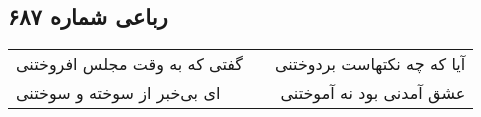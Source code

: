 \begin{center}
\section*{رباعی شماره ۶۸۷}
\label{sec:sh687}
\begin{longtable}{l p{0.5cm} r}
گفتی که به وقت مجلس افروختنی
&&
آیا که چه نکتهاست بردوختنی
\\
ای بی‌خبر از سوخته و سوختنی
&&
عشق آمدنی بود نه آموختنی
\\
\end{longtable}
\end{center}
